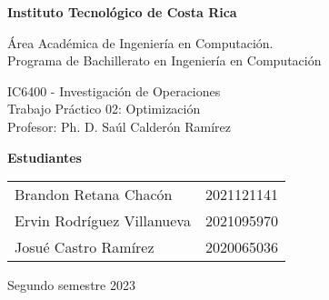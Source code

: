 \documentclass{article}
\begin{document}
\begin{doublespace}
\begin{center}
\Large{\textbf{Instituto Tecnológico de Costa Rica}}
\bigskip\par\end{center}

\begin{center}
Área Académica de Ingeniería en Computación.\\
Programa de Bachillerato en Ingeniería en Computación
\bigskip\par\end{center}

\begin{center}
IC6400 - Investigación de Operaciones \\
Trabajo Práctico 02: Optimización\\ 
Profesor: Ph. D. Saúl Calderón Ramírez 
\par\end{center}
\end{doublespace}

\begin{doublespace}
\begin{center}
\bigskip{}
\par\end{center}
\end{doublespace}

\begin{center}
\textbf{Estudiantes} \bigskip{} \\
\begin{table}[h]
\begin{center}
    \begin{tabular}{@{}lc@{}}
    Brandon Retana Chacón      & 2021121141 \\
    Ervin Rodríguez Villanueva & 2021095970 \\
    Josué Castro Ramírez       & 2020065036
    \end{tabular}
\end{center}
\end{table}
\vfill{}
\par\end{center}

\begin{center}
Segundo semestre 2023\newpage{}
\par\end{center}

\tableofcontents
\newpage





\end{document}
